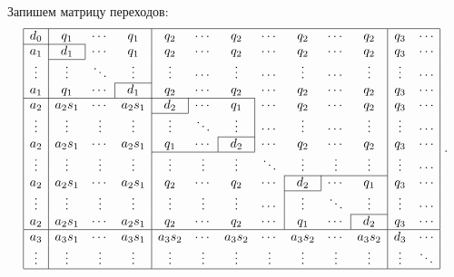 Запишем матрицу переходов:
\begin{equation}
\begin{array}{|ccccccccccccc|}
\hline
\multicolumn{1}{|c|}{d_0} & q_1 & \cdots & \multicolumn{1}{c|}{q_1} & q_2 & \cdots & q_2 & \cdots & q_2 & \cdots & \multicolumn{1}{c|}{q_2} & q_3 & \cdots\\
\cline{1-2}
a_1 & \multicolumn{1}{|c|}{d_1} & \cdots & \multicolumn{1}{c|}{q_1} & q_2 & \cdots & q_2 & \cdots & q_2 & \cdots & \multicolumn{1}{c|}{q_2} & q_3 & \cdots\\
\cline{2-2}
\multicolumn{1}{|c|}{\vdots} & \vdots & \ddots & \multicolumn{1}{c|}{\vdots} & \vdots & \cdots & \vdots & \cdots & \vdots & \cdots & \multicolumn{1}{c|}{\vdots} & \vdots & \cdots\\
\cline{4-4}
\multicolumn{1}{|c|}{a_1} & q_1 & \cdots & \multicolumn{1}{|c|}{d_1} & q_2 & \cdots & q_2 & \cdots & q_2 & \cdots & \multicolumn{1}{c|}{q_2} & q_3 & \cdots\\
\cline{1-7}
\multicolumn{1}{|c|}{a_2} & a_2 s_1 & \cdots & a_2 s_1 & \multicolumn{1}{|c|}{d_2} & \cdots & \multicolumn{1}{c|}{q_1} & \cdots & q_2 & \cdots & \multicolumn{1}{c|}{q_2} & q_3 & \cdots\\
\cline{5-5}
\multicolumn{1}{|c|}{\vdots} & \vdots & \vdots & \vdots & \multicolumn{1}{|c}{\vdots} & \ddots & \multicolumn{1}{c|}{\vdots} & \cdots  & \vdots & \cdots & \multicolumn{1}{c|}{\vdots} & \vdots & \cdots\\
\cline{7-7}
\multicolumn{1}{|c|}{a_2} & a_2 s_1 & \cdots & a_2 s_1 & \multicolumn{1}{|c}{q_1} & \cdots & \multicolumn{1}{|c|}{d_2} & \cdots & q_2 & \cdots & \multicolumn{1}{c|}{q_2} & q_3 & \cdots\\
\cline{5-7}
\multicolumn{1}{|c|}{\vdots} & \vdots & \vdots & \vdots & \multicolumn{1}{|c}{\vdots} & \vdots &\vdots & \ddots &\vdots & \vdots & \multicolumn{1}{c|}{\vdots} & \vdots & \cdots\\
\cline{9-11}
\multicolumn{1}{|c|}{a_2} & a_2 s_1 & \cdots & a_2 s_1 & \multicolumn{1}{|c}{q_2} & \cdots & q_2 & \cdots & \multicolumn{1}{|c|}{d_2} & \cdots & \multicolumn{1}{c|}{q_1} & q_3 & \cdots\\
\cline{9-9}
\multicolumn{1}{|c|}{\vdots} & \vdots & \vdots & \vdots & \multicolumn{1}{|c}{\vdots} & \vdots & \vdots & \cdots & \multicolumn{1}{|c}{\vdots} & \ddots & \multicolumn{1}{c|}{\vdots} & \vdots & \cdots\\
\cline{11-11}
\multicolumn{1}{|c|}{a_2} & a_2 s_1 & \cdots & a_2 s_1 & \multicolumn{1}{|c}{q_2} & \cdots & q_2 & \cdots & \multicolumn{1}{|c}{q_1} & \cdots & \multicolumn{1}{|c|}{d_2} & q_3 & \cdots\\
\hline
\multicolumn{1}{|c|}{a_3} & a_3 s_1 & \cdots & a_3 s_1 & \multicolumn{1}{|c}{a_3 s_2} & \cdots & a_3 s_2 & \cdots & a_3 s_2 & \cdots & \multicolumn{1}{c|}{a_3 s_2} & d_3 & \cdots\\
\multicolumn{1}{|c|}{\vdots} & \vdots & \vdots & \vdots & \multicolumn{1}{|c}{\vdots} & \vdots & \vdots & \vdots & \vdots & \vdots & \multicolumn{1}{c|}{\vdots} & \vdots & \ddots\\
\hline
\end{array}~. \label{sizova:nonsym}
\end{equation}
